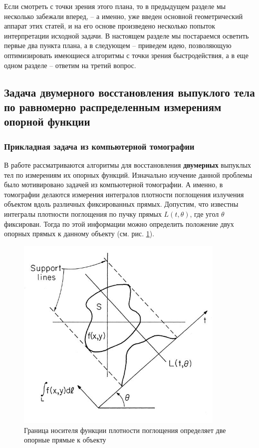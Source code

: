 \documentclass[a4paper, 12pt, titlepage]{article}
\theoremstyle{definition}
\theoremstyle{plain}
\theoremstyle{plain}
\begin{document}
Если смотреть с точки зрения этого плана, то в предыдущем разделе мы несколько
забежали вперед, -- а именно, уже введен основной геометрический аппарат этих
статей, и на его основе произведено несколько попыток интерпретации исходной
задачи. В настоящем разделе мы постараемся осветить первые два пункта плана, а
в следующем -- приведем идею, позволяющую оптимизировать имеющиеся алгоритмы с
точки зрения быстродействия, а в еще одном разделе -- ответим на третий вопрос.

\newpage
\subsection{Задача двумерного восстановления выпуклого тела по равномерно
распределенным измерениям опорной функции}

\subsubsection{Прикладная задача из компьютерной томографии}

В работе \cite[Prince - Willsky (1990)]{journals/pami/PrinceW90}
рассматриваются алгоритмы для восстановления \textbf{двумерных} выпуклых тел по
измерениям их опорных функций. Изначально изучение данной проблемы было
мотивировано задачей из компьютерной томографии. А именно, в томографии
делаются измерения интегралов плотности поглощения излучения объектом вдоль
различных фиксированных прямых. Допустим, что известны интегралы плотности
поглощения по пучку прямых $L(t, \theta)$, где угол $\theta$ фиксирован. Тогда
по этой информации можно определить положение двух опорных прямых к данному
объекту (см. рис. \ref{tomography-application}).

\begin{figure}[ht]
    \includegraphics[width=10cm]{images/tomography-application.jpg}
    \caption{Граница носителя функции плотности поглощения определяет две
    опорные прямые к объекту}
    \label{tomography-application}
\end{figure}
\end{document}
